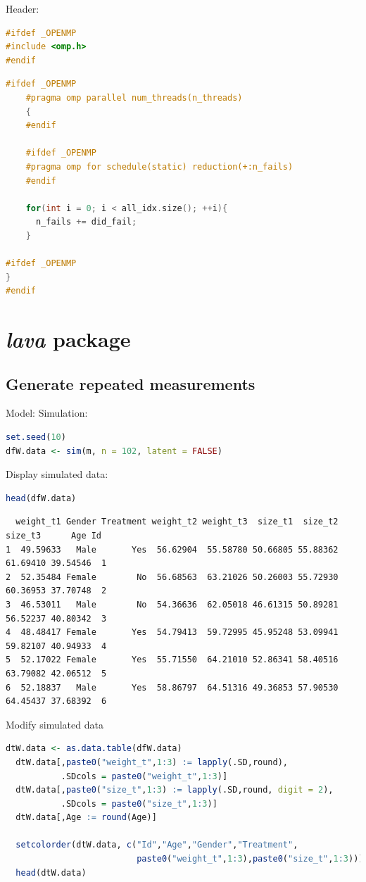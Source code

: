 \documentclass{article}
\begin{document}
Header:
\begin{lstlisting}[language=C++,numbers=none]
#ifdef _OPENMP
#include <omp.h>
#endif
\end{lstlisting}


\begin{lstlisting}[language=C++,numbers=none]
    #ifdef _OPENMP
    #pragma omp parallel num_threads(n_threads)
    {
    #endif

    #ifdef _OPENMP
    #pragma omp for schedule(static) reduction(+:n_fails)
    #endif

    for(int i = 0; i < all_idx.size(); ++i){
      n_fails += did_fail;
    }

#ifdef _OPENMP
}
#endif
\end{lstlisting}
\section{\emph{lava} package}
\label{sec:orgdac97a8}
\subsection{Generate repeated measurements}
\label{sec:org1a5e5ce}
Model:
Simulation:
\begin{lstlisting}[language=r,numbers=none]
set.seed(10)
dfW.data <- sim(m, n = 102, latent = FALSE)
\end{lstlisting}

Display simulated data:
\begin{lstlisting}[language=r,numbers=none]
head(dfW.data)
\end{lstlisting}

\label{}
\begin{verbatim}
  weight_t1 Gender Treatment weight_t2 weight_t3  size_t1  size_t2  size_t3      Age Id
1  49.59633   Male       Yes  56.62904  55.58780 50.66805 55.88362 61.69410 39.54546  1
2  52.35484 Female        No  56.68563  63.21026 50.26003 55.72930 60.36953 37.70748  2
3  46.53011   Male        No  54.36636  62.05018 46.61315 50.89281 56.52237 40.80342  3
4  48.48417 Female       Yes  54.79413  59.72995 45.95248 53.09941 59.82107 40.94933  4
5  52.17022 Female       Yes  55.71550  64.21010 52.86341 58.40516 63.79082 42.06512  5
6  52.18837   Male       Yes  58.86797  64.51316 49.36853 57.90530 64.45437 37.68392  6
\end{verbatim}


Modify simulated data 
\begin{lstlisting}[language=r,numbers=none]
  dtW.data <- as.data.table(dfW.data)
  dtW.data[,paste0("weight_t",1:3) := lapply(.SD,round),
           .SDcols = paste0("weight_t",1:3)]
  dtW.data[,paste0("size_t",1:3) := lapply(.SD,round, digit = 2),
           .SDcols = paste0("size_t",1:3)]
  dtW.data[,Age := round(Age)]

  setcolorder(dtW.data, c("Id","Age","Gender","Treatment",
                          paste0("weight_t",1:3),paste0("size_t",1:3)))
  head(dtW.data)
\end{lstlisting}
\end{document}
